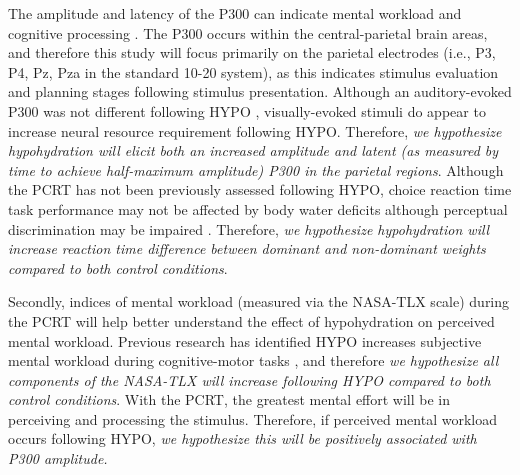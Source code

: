 The amplitude and latency of the P300 can indicate mental workload and cognitive processing \cite{park_making_2015}. The P300 occurs within the central-parietal brain areas, and therefore this study will focus primarily on the parietal electrodes (i.e., P3, P4, Pz, Pza in the standard 10-20 system), as this indicates stimulus evaluation and planning stages following stimulus presentation. Although an auditory-evoked P300 was not different following HYPO \cite{szinnai_effect_2005}, visually-evoked stimuli do appear to increase neural resource requirement \cite{kempton_dehydration_2011,watson_mild_2015} following HYPO. Therefore, \textit{we hypothesize hypohydration will elicit both an increased amplitude and latent (as measured by time to achieve half-maximum amplitude) P300 in the parietal regions}. Although the PCRT has not been previously assessed following HYPO, choice reaction time task performance may not be affected by body water deficits \cite{danci_voluntary_2009} although perceptual discrimination may be impaired \cite{cian_effects_2001}. Therefore, \textit{we hypothesize hypohydration will increase reaction time difference between dominant and non-dominant weights compared to both control conditions}. 

Secondly, indices of mental workload (measured via the NASA-TLX scale) during the PCRT will help better understand the effect of hypohydration on perceived mental workload. Previous research has identified HYPO increases subjective mental workload during cognitive-motor tasks \cite{szinnai_effect_2005}, and therefore \textit{we hypothesize all components of the NASA-TLX will increase following HYPO compared to both control conditions}. With the PCRT, the greatest mental effort will be in perceiving and processing the stimulus. Therefore, if perceived mental workload occurs following HYPO, \textit{we hypothesize this will be positively associated with P300 amplitude.}
